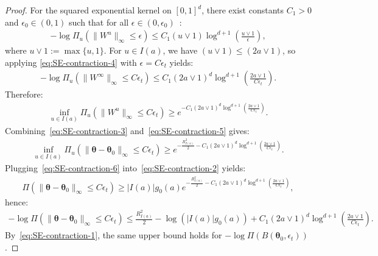 \documentclass[final,12pt]{colt2026} %
\begin{document}
\begin{proof}
For the squared exponential kernel on $[0, 1]^{d}$, there exist constants $C_1 > 0$ and $\epsilon_0\in (0, 1)$ such that for all $\epsilon \in (0, \epsilon_0)$~\citep{vanderVaart2009}:
\begin{align}
\label{eq:SE-contraction-4}
-\log \Pi_u\left(\lVert W^{u}\rVert_{\infty} \leq \epsilon\right) \leq C_1 (u \vee 1) \log^{d+1}\left(\frac{u \vee 1}{\epsilon}\right),
\end{align}
where $u\vee 1:= \max\{u, 1\}$. For $u\in I(a)$, we have $(u\vee 1) \leq (2a\vee 1)$, so applying \eqref{eq:SE-contraction-4} with $\epsilon = C\epsilon_t$ yields:
\begin{align*}
-\log \Pi_u\left(\lVert W^{\infty}\rVert_{\infty} \leq C\epsilon_t\right) \leq C_1 (2a\vee 1)^{d} \log^{d+1}\left(\frac{2a\vee 1}{C\epsilon_t}\right).
\end{align*}
Therefore:
\begin{align}
\label{eq:SE-contraction-5}
\inf_{u\in I(a)} \Pi_u\left(\lVert W^{u}\rVert_{\infty} \leq C\epsilon_t\right) \geq e^{-C_1 (2a\vee 1)^{d} \log^{d+1}\left(\frac{2a\vee 1}{C\epsilon_t}\right)}.
\end{align}
Combining~\eqref{eq:SE-contraction-3} and~\eqref{eq:SE-contraction-5} gives:
\begin{align}
\label{eq:SE-contraction-6}
\inf_{u\in I(a)}\Pi_u\left(\lVert \pmb\theta-\pmb\theta_0\rVert_{\infty} \leq C\epsilon_t\right) \geq e^{-\frac{R^{2}_{I(a)}}{2} - C_1 (2a\vee 1)^{d} \log^{d+1}\left(\frac{2a\vee 1}{C\epsilon_t}\right)}.
\end{align}
Plugging~\eqref{eq:SE-contraction-6} into~\eqref{eq:SE-contraction-2} yields:
\begin{align*}
\Pi\left(\lVert \pmb\theta - \pmb\theta_0\rVert_{\infty}\leq C\epsilon_t\right) \geq |I(a)| g_0(a) e^{-\frac{R^{2}_{I(a)}}{2} - C_1(2a\vee 1)^{d}\log^{d+1}\left(\frac{2a\vee 1}{C\epsilon_t}\right)},
\end{align*}
hence:
\begin{align}
\label{eq:SE-contraction-7}
-\log \Pi\left(\lVert \pmb\theta - \pmb\theta_0\rVert_{\infty} \leq C\epsilon_t\right) \leq \frac{R^{2}_{I(a)}}{2} - \log(|I(a)| g_0(a)) + C_1(2a\vee 1)^{d}\log^{d+1}\left(\frac{2a\vee 1}{C\epsilon_t}\right).
\end{align}
By~\eqref{eq:SE-contraction-1}, the same upper bound holds for $-\log \Pi(B(\pmb\theta_0, \epsilon_t))$.


\end{proof}
\end{document}
